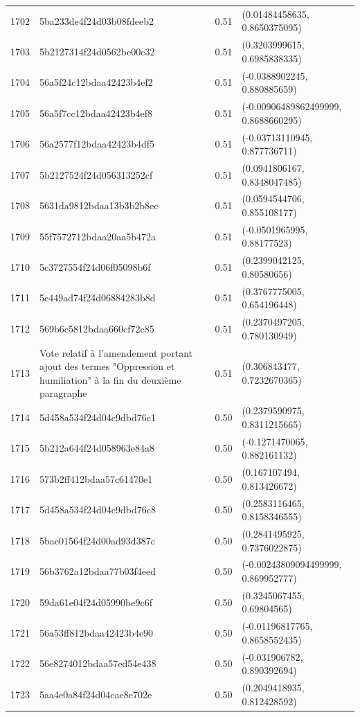 \begin{table}[ht]
\begin{tabular}{rlrl}
  1702 & 5ba233de4f24d03b08fdeeb2 & 0.51 & (0.01484458635, 0.8650375095) \\ 
  1703 & 5b2127314f24d0562be00c32 & 0.51 & (0.3203999615, 0.6985838335) \\ 
  1704 & 56a5f24c12bdaa42423b4ef2 & 0.51 & (-0.0388902245, 0.880885659) \\ 
  1705 & 56a5f7cc12bdaa42423b4ef8 & 0.51 & (-0.00906489862499999, 0.8688660295) \\ 
  1706 & 56a2577f12bdaa42423b4df5 & 0.51 & (-0.03713110945, 0.877736711) \\ 
  1707 & 5b2127524f24d056313252cf & 0.51 & (0.0941806167, 0.8348047485) \\ 
  1708 & 5631da9812bdaa13b3b2b8ec & 0.51 & (0.0594544706, 0.855108177) \\ 
  1709 & 55f7572712bdaa20aa5b472a & 0.51 & (-0.0501965995, 0.88177523) \\ 
  1710 & 5c3727554f24d06f05098b6f & 0.51 & (0.2399042125, 0.80580656) \\ 
  1711 & 5c449ad74f24d06884283b8d & 0.51 & (0.3767775005, 0.654196448) \\ 
  1712 & 569b6c5812bdaa660cf72c85 & 0.51 & (0.2370497205, 0.780130949) \\ 
  1713 & Vote relatif à l'amendement portant ajout des termes "Oppression et humiliation" à la fin du deuxième paragraphe & 0.51 & (0.306843477, 0.7232670365) \\ 
  1714 & 5d458a534f24d04c9dbd76c1 & 0.50 & (0.2379590975, 0.8311215665) \\ 
  1715 & 5b212a644f24d058963e84a8 & 0.50 & (-0.1271470065, 0.882161132) \\ 
  1716 & 573b2ff412bdaa57c61470e1 & 0.50 & (0.167107494, 0.813426672) \\ 
  1717 & 5d458a534f24d04c9dbd76c8 & 0.50 & (0.2583116465, 0.8158346555) \\ 
  1718 & 5bae01564f24d00ad93d387c & 0.50 & (0.2841495925, 0.7376022875) \\ 
  1719 & 56b3762a12bdaa77b03f4eed & 0.50 & (-0.00243809094499999, 0.869952777) \\ 
  1720 & 59da61e04f24d05990be9c6f & 0.50 & (0.3245067455, 0.69804565) \\ 
  1721 & 56a53ff812bdaa42423b4e90 & 0.50 & (-0.01196817765, 0.8658552435) \\ 
  1722 & 56e8274012bdaa57ed54e438 & 0.50 & (-0.031906782, 0.890392694) \\ 
  1723 & 5aa4e0a84f24d04cae8e702e & 0.50 & (0.2049418935, 0.812428592) \\ 

\end{tabular}
\end{table}
